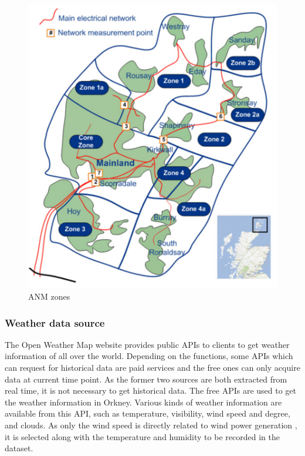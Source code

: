 \documentclass[12pt,a4paper]{report}
\begin{document}
                \begin{figure}[ht]
                    \centerline{\includegraphics[scale=1]{map}}
                    \caption{ANM zones}
                    \label{fig_map}
                \end{figure}
            
            \subsubsection{Weather data source}
            \label{text_weather_data_source}
                The Open Weather Map website \cite{website:OpenWeatherMap} provides public APIs to clients to get weather information of all over the world.
                Depending on the functions, some APIs which can request for historical data are paid services and the free ones can only acquire data at current time point.
                As the former two sources are both extracted from real time, it is not necessary to get historical data. The free APIs are used to get the weather
                information in Orkney. Various kinds of weather information are available from this API, such as temperature, visibility, wind speed and degree, and clouds.
                As only the wind speed is directly related to wind power generation \cite{paper:Shao2010}, it is selected along with the temperature and humidity to be recorded in the dataset.
            
\end{document}
